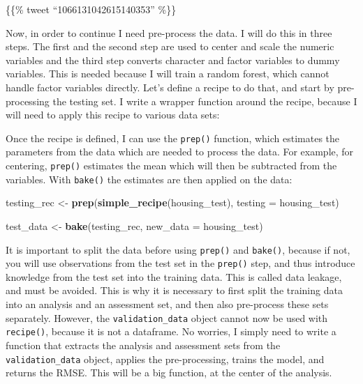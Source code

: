 \documentclass[]{gitbook}
\newenvironment{Shaded}{\begin{snugshade}}{\end{snugshade}}
\newcommand{\ControlFlowTok}[1]{\textcolor[rgb]{0.13,0.29,0.53}{\textbf{#1}}}
\newcommand{\DataTypeTok}[1]{\textcolor[rgb]{0.13,0.29,0.53}{#1}}
\newcommand{\KeywordTok}[1]{\textcolor[rgb]{0.13,0.29,0.53}{\textbf{#1}}}
\newcommand{\NormalTok}[1]{#1}
\newcommand{\OperatorTok}[1]{\textcolor[rgb]{0.81,0.36,0.00}{\textbf{#1}}}
\newcommand{\StringTok}[1]{\textcolor[rgb]{0.31,0.60,0.02}{#1}}
\begin{document}
\{\{\% tweet ``1066131042615140353'' \%\}\}

Now, in order to continue I need pre-process the data. I will do this in three steps.
The first and the second step are used to center and scale the numeric variables and the third step
converts character and factor variables to dummy variables. This is needed because I will train a
random forest, which cannot handle factor variables directly. Let's define a recipe to do that,
and start by pre-processing the testing set. I write a wrapper function around the recipe,
because I will need to apply this recipe to various data sets:

\begin{Shaded}
\end{Shaded}

Once the recipe is defined, I can use the \texttt{prep()} function, which estimates the parameters from
the data which are needed to process the data. For example, for centering, \texttt{prep()} estimates
the mean which will then be subtracted from the variables. With \texttt{bake()} the estimates are then
applied on the data:

\begin{Shaded}
\begin{Highlighting}[]
\NormalTok{testing_rec <-}\StringTok{ }\KeywordTok{prep}\NormalTok{(}\KeywordTok{simple_recipe}\NormalTok{(housing_test), }\DataTypeTok{testing =}\NormalTok{ housing_test)}

\NormalTok{test_data <-}\StringTok{ }\KeywordTok{bake}\NormalTok{(testing_rec, }\DataTypeTok{new_data =}\NormalTok{ housing_test)}
\end{Highlighting}
\end{Shaded}

It is important to split the data before using \texttt{prep()} and \texttt{bake()}, because if not, you will
use observations from the test set in the \texttt{prep()} step, and thus introduce knowledge from the test
set into the training data. This is called data leakage, and must be avoided. This is why it is
necessary to first split the training data into an analysis and an assessment set, and then also
pre-process these sets separately. However, the \texttt{validation\_data} object cannot now be used with
\texttt{recipe()}, because it is not a dataframe. No worries, I simply need to write a function that extracts
the analysis and assessment sets from the \texttt{validation\_data} object, applies the pre-processing, trains
the model, and returns the RMSE. This will be a big function, at the center of the analysis.
\end{document}
